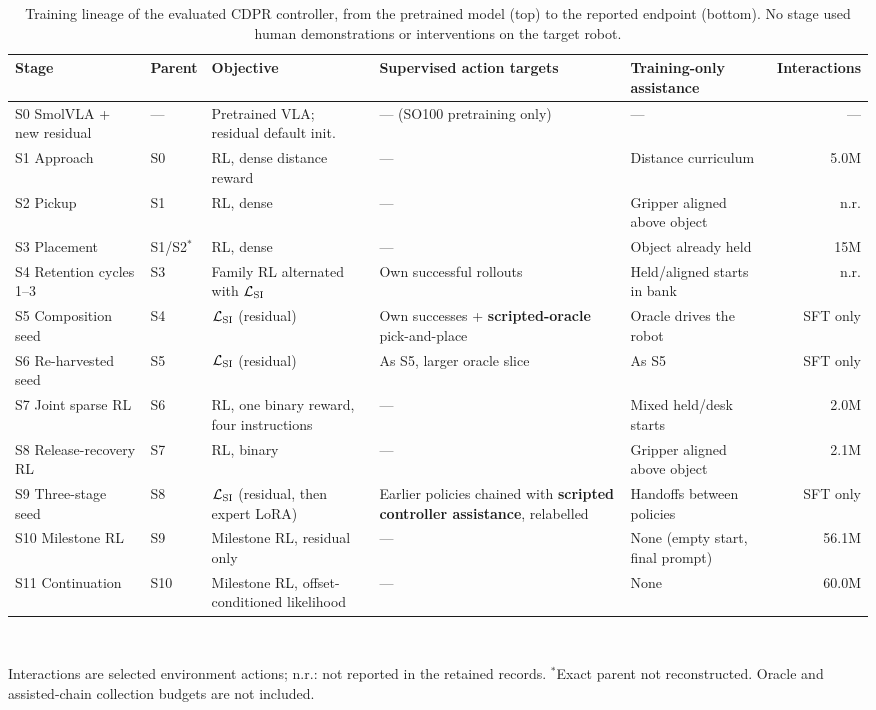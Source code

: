 \begin{table}[!t]
\caption{Training lineage of the evaluated CDPR controller, from the pretrained model (top) to the reported endpoint (bottom). No stage used human demonstrations or interventions on the target robot.}
\label{tab:lineage}\centering\footnotesize
\setlength{\tabcolsep}{3pt}
\begin{tabular}{@{}P{3.1cm}P{1.1cm}P{3.6cm}P{4.3cm}P{3.2cm}r@{}}\toprule
Stage & Parent & Objective & Supervised action targets & Training-only assistance & Interactions\\\midrule
S0 SmolVLA + new residual & --- & Pretrained VLA; residual default init. & --- (SO100 pretraining only) & --- & ---\\
S1 Approach & S0 & RL, dense distance reward & --- & Distance curriculum & 5.0M\\
S2 Pickup & S1 & RL, dense & --- & Gripper aligned above object & n.r.\\
S3 Placement & S1/S2$^*$ & RL, dense & --- & Object already held & 15M\\
S4 Retention cycles 1--3 & S3 & Family RL alternated with $\mathcal L_{\rm SI}$ & Own successful rollouts & Held/aligned starts in bank & n.r.\\
S5 Composition seed & S4 & $\mathcal L_{\rm SI}$ (residual) & Own successes + \textbf{scripted-oracle} pick-and-place & Oracle drives the robot & SFT only\\
S6 Re-harvested seed & S5 & $\mathcal L_{\rm SI}$ (residual) & As S5, larger oracle slice & As S5 & SFT only\\
S7 Joint sparse RL & S6 & RL, one binary reward, four instructions & --- & Mixed held/desk starts & 2.0M\\
S8 Release-recovery RL & S7 & RL, binary & --- & Gripper aligned above object & 2.1M\\
S9 Three-stage seed & S8 & $\mathcal L_{\rm SI}$ (residual, then expert LoRA) & Earlier policies chained with \textbf{scripted controller assistance}, relabelled & Handoffs between policies & SFT only\\
S10 Milestone RL & S9 & Milestone RL, residual only & --- & None (empty start, final prompt) & 56.1M\\
S11 Continuation & S10 & Milestone RL, offset-conditioned likelihood & --- & None & 60.0M\\\bottomrule
\end{tabular}\\[2pt]
\raggedright\footnotesize Interactions are selected environment actions; n.r.: not reported in the retained records. $^*$Exact parent not reconstructed. Oracle and assisted-chain collection budgets are not included.
\end{table}

